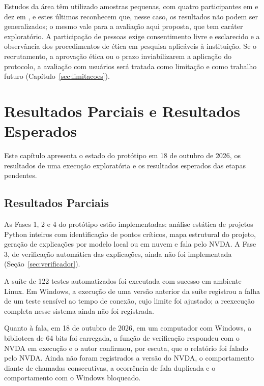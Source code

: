\documentclass[
    12pt,                   %
    openright,              %
    oneside,                %
    a4paper,                %
    sumario=tradicional,    %
    english,                %
    brazil,                 %
    ]{abntex2}
\begin{document}
Estudos da área têm utilizado amostras pequenas, com quatro participantes em \textcite{latinoware34224} e dez em \textcite{latinoware20457}, e estes últimos reconhecem que, nesse caso, os resultados não podem ser generalizados; o mesmo vale para a avaliação aqui proposta, que tem caráter exploratório. A participação de pessoas exige consentimento livre e esclarecido e a observância dos procedimentos de ética em pesquisa aplicáveis à instituição. Se o recrutamento, a aprovação ética ou o prazo inviabilizarem a aplicação do protocolo, a avaliação com usuários será tratada como limitação e como trabalho futuro (Capítulo~\ref{sec:limitacoes}).


\chapter{Resultados Parciais e Resultados Esperados}\label{sec:resultEsperados}

Este capítulo apresenta o estado do protótipo em 18 de outubro de 2026, os resultados de uma execução exploratória e os resultados esperados das etapas pendentes.

\section{Resultados Parciais}\label{sec:parciais}

As Fases 1, 2 e 4 do protótipo estão implementadas: análise estática de projetos Python inteiros com identificação de pontos críticos, mapa estrutural do projeto, geração de explicações por modelo local ou em nuvem e fala pelo NVDA. A Fase 3, de verificação automática das explicações, ainda não foi implementada (Seção~\ref{sec:verificador}).

A suíte de 122 testes automatizados foi executada com sucesso em ambiente Linux. Em Windows, a execução de uma versão anterior da suíte registrou a falha de um teste sensível ao tempo de conexão, cujo limite foi ajustado; a reexecução completa nesse sistema ainda não foi registrada.

Quanto à fala, em 18 de outubro de 2026, em um computador com Windows, a biblioteca de 64 bits foi carregada, a função de verificação respondeu com o NVDA em execução e o autor confirmou, por escuta, que o relatório foi falado pelo NVDA. Ainda não foram registrados a versão do NVDA, o comportamento diante de chamadas consecutivas, a ocorrência de fala duplicada e o comportamento com o Windows bloqueado.
\end{document}
